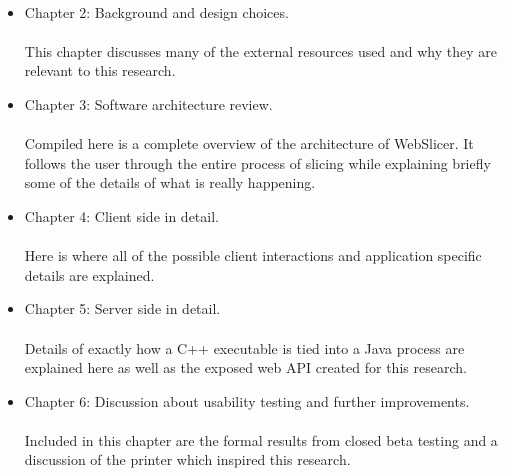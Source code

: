\paragraph{}
\begin{itemize}
\item Chapter 2: Background and design choices.
	\paragraph{}
	This chapter discusses many of the external resources used and why they are relevant to this research.
\item Chapter 3: Software architecture review.
	\paragraph{}
	Compiled here is a complete overview of the architecture of WebSlicer. It follows the user through the entire process of slicing while explaining briefly some of the details of what is really happening.
\item Chapter 4: Client side in detail. 
	\paragraph{}
	Here is where all of the possible client interactions and application specific details are explained.
\item Chapter 5: Server side in detail.
	\paragraph{}
	Details of exactly how a C++ executable is tied into a Java process are explained here as well as the exposed web API created for this research.
\item Chapter 6: Discussion about usability testing and further improvements.
	\paragraph{}
	Included in this chapter are the formal results from closed beta testing and a discussion of the printer which inspired this research.
\end{itemize}

